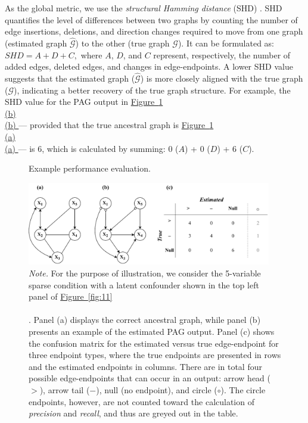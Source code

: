 \documentclass[twoside, 11pt]{article}
\newcommand*{\figref}[2][]{%
  \hyperref[{fig:#2}]{%
    Figure~\ref*{fig:#2}%
    \ifx\\#1\\%
    \else
      #1%
    \fi
  }%
}
\begin{document}
As the global metric, we use the \textit{structural Hamming distance} (SHD) \citep{de2009comparison}. SHD quantifies the level of differences between two graphs by counting the number of edge insertions, deletions, and direction changes required to move from one graph (estimated graph $\hat{\mathcal{G}}$) to the other (true graph $\mathcal{G}$). It can be formulated as:
$\textit{SHD} = A + D + C,$
where $A$, $D$, and $C$ represent, respectively, the number of added edges, deleted edges, and changes in edge-endpoints. A lower SHD value suggests that the estimated graph ($\hat{\mathcal{G}}$) is more closely aligned with the true graph ($\mathcal{G}$), indicating a better recovery of the true graph structure. For example, the SHD value for the PAG output in \figref[(b)]{12} --- provided that the true ancestral graph is \figref[(a)]{12} --- is 6, which is calculated by summing: 0 ($A$) + 0 ($D$) + 6 ($C$).

\vspace{3mm}

\begin{figure}[!hb]
    \centering
        \caption{Example performance evaluation.}
        \vspace{1mm}
        \includegraphics[width=0.95\textwidth]{figures/Fig13.pdf}
        \vspace*{2mm}
        \caption*{\small{\textit{Note.} 
        For the purpose of illustration, we consider the 5-variable sparse condition with a latent confounder shown in the top left panel of \figref[]{11}. Panel (a) displays the correct ancestral graph, while panel (b) presents an example of the estimated PAG output. Panel (c) shows the confusion matrix for the estimated versus true edge-endpoint for three endpoint types, where the true endpoints are presented in rows and the estimated endpoints in columns. There are in total four possible edge-endpoints that can occur in an output: arrow head ($>$), arrow tail ($-$), null (no endpoint), and circle ($\circ$). The circle endpoints, however, are not counted toward the calculation of \textit{precision} and \textit{recall}, and thus are greyed out in the table.}}
    \label{fig:12}
\end{figure}
\end{document}
